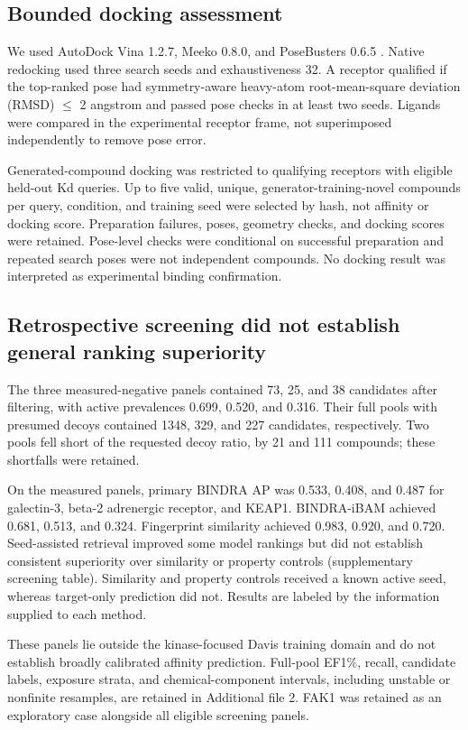 \documentclass[12pt,a4paper]{article}
\begin{document}
\subsection*{Bounded docking assessment}
We used AutoDock Vina 1.2.7, Meeko 0.8.0, and PoseBusters 0.6.5 \citep{vina2021,meeko,posebusters2024}. Native redocking used three search seeds and exhaustiveness 32. A receptor qualified if the top-ranked pose had symmetry-aware heavy-atom root-mean-square deviation (RMSD) \(\leq\) 2 angstrom and passed pose checks in at least two seeds. Ligands were compared in the experimental receptor frame, not superimposed independently to remove pose error.

Generated-compound docking was restricted to qualifying receptors with eligible held-out Kd queries. Up to five valid, unique, generator-training-novel compounds per query, condition, and training seed were selected by hash, not affinity or docking score. Preparation failures, poses, geometry checks, and docking scores were retained. Pose-level checks were conditional on successful preparation and repeated search poses were not independent compounds. No docking result was interpreted as experimental binding confirmation.

\subsection*{Retrospective screening did not establish general ranking superiority}
The three measured-negative panels contained 73, 25, and 38 candidates after filtering, with active prevalences 0.699, 0.520, and 0.316. Their full pools with presumed decoys contained 1348, 329, and 227 candidates, respectively. Two pools fell short of the requested decoy ratio, by 21 and 111 compounds; these shortfalls were retained.

On the measured panels, primary BINDRA AP was 0.533, 0.408, and 0.487 for galectin-3, beta-2 adrenergic receptor, and KEAP1. BINDRA-iBAM achieved 0.681, 0.513, and 0.324. Fingerprint similarity achieved 0.983, 0.920, and 0.720. Seed-assisted retrieval improved some model rankings but did not establish consistent superiority over similarity or property controls (supplementary screening table). Similarity and property controls received a known active seed, whereas target-only prediction did not. Results are labeled by the information supplied to each method.

These panels lie outside the kinase-focused Davis training domain and do not establish broadly calibrated affinity prediction. Full-pool EF1\%, recall, candidate labels, exposure strata, and chemical-component intervals, including unstable or nonfinite resamples, are retained in Additional file 2. FAK1 was retained as an exploratory case alongside all eligible screening panels.
\end{document}
